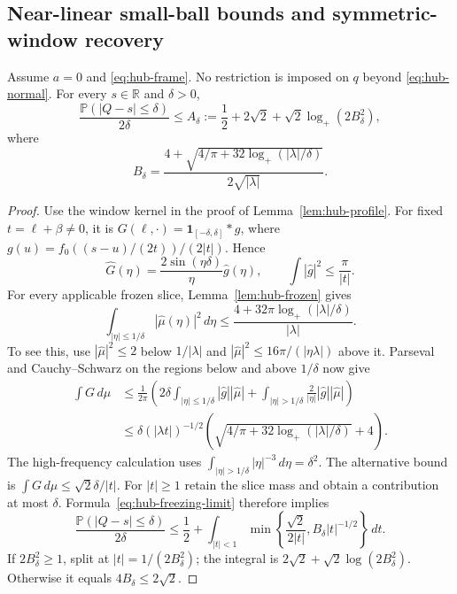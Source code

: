 \subsection{Near-linear small-ball bounds and symmetric-window recovery}

\begin{theorem}\label{thm:hub-loglog-smallball}
Assume $a=0$ and \eqref{eq:hub-frame}.  No restriction is imposed on
$q$ beyond \eqref{eq:hub-normal}.  For every $s\in\mathbb R$ and
$\delta>0$,
\begin{equation}\label{eq:hub-loglog-smallball}
 \frac{\mathbb P(|Q-s|\le\delta)}{2\delta}
 \le A_\delta:=\frac12+2\sqrt2+
                 \sqrt2\log_+(2B_\delta^2),
\end{equation}
where
\begin{equation}\label{eq:hub-bdelta}
 B_\delta=\frac{4+\sqrt{4/\pi+32\log_+(|\lambda|/\delta)}}
                     {2\sqrt{|\lambda|}}.
\end{equation}
\end{theorem}

\begin{proof}
Use the window kernel in the proof of Lemma~\ref{lem:hub-profile}.
For fixed $t=\ell+\beta\ne0$, it is
$G(\ell,\cdot)=\mathbf1_{[-\delta,\delta]}*g$, where
$g(u)=f_0((s-u)/(2t))/(2|t|)$.  Hence
\[
 \widehat G(\eta)=\frac{2\sin(\eta\delta)}{\eta}\widehat g(\eta),
 \qquad \int|\widehat g|^2\le\frac\pi{|t|}.
\]
For every applicable frozen slice, Lemma~\ref{lem:hub-frozen} gives
\[
 \int_{|\eta|\le1/\delta}|\widehat\mu(\eta)|^2\,d\eta
 \le\frac{4+32\pi\log_+(|\lambda|/\delta)}{|\lambda|}.
\]
To see this, use $|\widehat\mu|^2\le2$ below $1/|\lambda|$
and $|\widehat\mu|^2\le16\pi/(|\eta\lambda|)$ above it.
Parseval and Cauchy--Schwarz on the regions below and above
$1/\delta$ now give
\begin{align*}
 \int G\,d\mu
 &\le\frac1{2\pi}\left(
 2\delta\int_{|\eta|\le1/\delta}|\widehat g||\widehat\mu|
 +\int_{|\eta|>1/\delta}\frac2{|\eta|}
                          |\widehat g||\widehat\mu|\right)\\
 &\le\delta(|\lambda t|)^{-1/2}
          \left(\sqrt{4/\pi+32\log_+(|\lambda|/\delta)}+4\right).
\end{align*}
The high-frequency calculation uses
$\int_{|\eta|>1/\delta}|\eta|^{-3}\,d\eta=\delta^2$.
The alternative bound is
$\int G\,d\mu\le\sqrt2\delta/|t|$.
For $|t|\ge1$ retain the slice mass and obtain a contribution at most
$\delta$.  Formula~\eqref{eq:hub-freezing-limit} therefore implies
\[
 \frac{\mathbb P(|Q-s|\le\delta)}{2\delta}
 \le\frac12+\int_{|t|<1}
       \min\left\{\frac{\sqrt2}{2|t|},
                         B_\delta|t|^{-1/2}\right\}\,dt.
\]
If $2B_\delta^2\ge1$, split at
$|t|=1/(2B_\delta^2)$; the integral is
$2\sqrt2+\sqrt2\log(2B_\delta^2)$.
Otherwise it equals $4B_\delta\le2\sqrt2$.
\end{proof}

